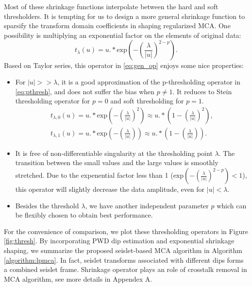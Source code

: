 Most of these shrinkage functions interpolate between the hard and soft thresholders. It is tempting for us to design a more general shrinkage function to sparsify the transform domain coefficients in shaping regularized MCA. One possibility is  multiplying an exponential factor on the elements of original data:
\begin{equation}\label{eq:gen_op}
t_{\lambda}(u)=u.*\mathrm{exp}(-(\frac{\lambda}{|u|})^{2-p}).
\end{equation}
Based on Taylor series, this operator in \eqref{eq:gen_op} enjoys some nice properties:
\begin{itemize}
 \item For $|u|>>\lambda$, it is a good approximation of the p-thresholding operator in \eqref{eq:pthresh}, and does not suffer the bias when $p\neq 1$. It reduces to Stein thresholding operator for $p=0$ and soft thresholding for $p=1$. 
  \begin{equation}\label{eq:exp_sergey} 
  \begin{split}   
  t_{\lambda,0}(u)=u.*\mathrm{exp}(-(\frac{\lambda}{|u|})^{2})\approx u.*(1-(\frac{\lambda}{|u|})^{2}),\\
  t_{\lambda,1}(u)=u.*\mathrm{exp}(-(\frac{\lambda}{|u|}))\approx u.*(1-(\frac{\lambda}{|u|})).
  \end{split}
\end{equation}
 \item It is free of non-differentiable singularity at the thresholding point $\lambda$. The transition between the small values and the large values is smoothly stretched. Due to the expenential factor less than 1 ($\mathrm{exp}(-(\frac{\lambda}{|u|})^{2-p})<1$), this operator will slightly decrease the data amplitude, even for $|u|<\lambda$.
 \item Besides the threshold $\lambda$, we have another independent parameter $p$ which can be flexibly chosen to obtain best performance.
\end{itemize}
For the convenience of comparison, we plot these thresholding operators in Figure \ref{fig:thresh}. By incorporating PWD dip estimation and exponential shrinkage shaping, we summarize the proposed seislet-based MCA algorithm in Algorithm \ref{algorithm:lpmca}. In fact, seislet transforms associated with different dips forms a combined seislet frame. Shrinkage operator plays an role of crosstalk removal in MCA algorithm, see more details in Appendex A.


